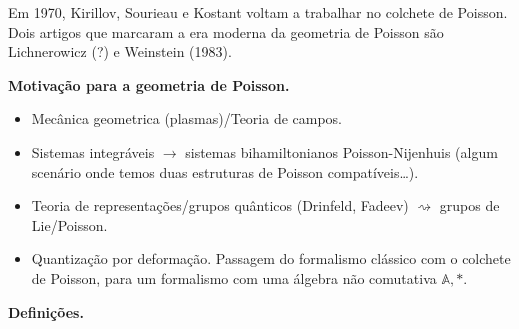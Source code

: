 Em 1970, Kirillov, Sourieau e Kostant voltam
a trabalhar no colchete de Poisson. Dois
artigos que marcaram a era moderna da
geometria de Poisson são Lichnerowicz (?) e
Weinstein (1983).

\medskip\noindent
{\bf Motivação para a geometria de Poisson.}
\begin{itemize}
\item Mecânica geometrica (plasmas)/Teoria de
campos.
\item Sistemas integráveis $\to$ sistemas
bihamiltonianos Poisson-Nijenhuis (algum
scenário onde temos duas estruturas de
Poisson compatíveis\ldots{}).
\item Teoria de representações/grupos
quânticos (Drinfeld, Fadeev)
$\rightsquigarrow$ grupos de Lie/Poisson.
\item Quantização por deformação. Passagem do
formalismo clássico com o colchete de
Poisson, para um formalismo com uma álgebra
não comutativa $\mathbb{A},*$.
\end{itemize}

\medskip\noindent
{\bf Definições.}

